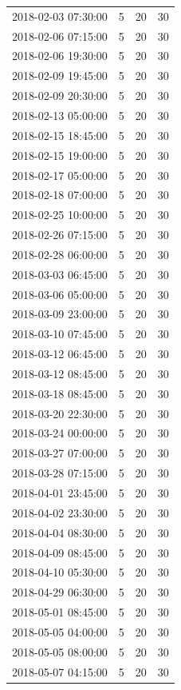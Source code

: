 \begin{tabular}{lrrr}
2018-02-03 07:30:00 & 5 & 20 & 30 \\
2018-02-06 07:15:00 & 5 & 20 & 30 \\
2018-02-06 19:30:00 & 5 & 20 & 30 \\
2018-02-09 19:45:00 & 5 & 20 & 30 \\
2018-02-09 20:30:00 & 5 & 20 & 30 \\
2018-02-13 05:00:00 & 5 & 20 & 30 \\
2018-02-15 18:45:00 & 5 & 20 & 30 \\
2018-02-15 19:00:00 & 5 & 20 & 30 \\
2018-02-17 05:00:00 & 5 & 20 & 30 \\
2018-02-18 07:00:00 & 5 & 20 & 30 \\
2018-02-25 10:00:00 & 5 & 20 & 30 \\
2018-02-26 07:15:00 & 5 & 20 & 30 \\
2018-02-28 06:00:00 & 5 & 20 & 30 \\
2018-03-03 06:45:00 & 5 & 20 & 30 \\
2018-03-06 05:00:00 & 5 & 20 & 30 \\
2018-03-09 23:00:00 & 5 & 20 & 30 \\
2018-03-10 07:45:00 & 5 & 20 & 30 \\
2018-03-12 06:45:00 & 5 & 20 & 30 \\
2018-03-12 08:45:00 & 5 & 20 & 30 \\
2018-03-18 08:45:00 & 5 & 20 & 30 \\
2018-03-20 22:30:00 & 5 & 20 & 30 \\
2018-03-24 00:00:00 & 5 & 20 & 30 \\
2018-03-27 07:00:00 & 5 & 20 & 30 \\
2018-03-28 07:15:00 & 5 & 20 & 30 \\
2018-04-01 23:45:00 & 5 & 20 & 30 \\
2018-04-02 23:30:00 & 5 & 20 & 30 \\
2018-04-04 08:30:00 & 5 & 20 & 30 \\
2018-04-09 08:45:00 & 5 & 20 & 30 \\
2018-04-10 05:30:00 & 5 & 20 & 30 \\
2018-04-29 06:30:00 & 5 & 20 & 30 \\
2018-05-01 08:45:00 & 5 & 20 & 30 \\
2018-05-05 04:00:00 & 5 & 20 & 30 \\
2018-05-05 08:00:00 & 5 & 20 & 30 \\
2018-05-07 04:15:00 & 5 & 20 & 30 \\

\end{tabular}
